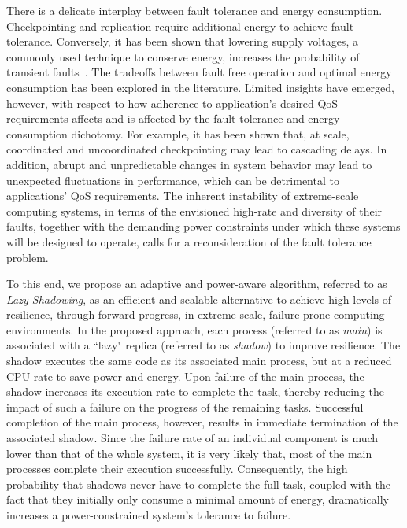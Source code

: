 There is a delicate interplay between fault tolerance and energy consumption. Checkpointing and replication require additional energy to achieve fault tolerance. Conversely, it has been shown that lowering supply voltages, a commonly used technique to conserve energy, increases the probability of transient faults~\cite{chandra2008defect}. The tradeoffs between fault free operation and optimal energy consumption has been explored in the literature. Limited insights have emerged, however, with respect to how adherence to application's desired QoS requirements affects and is affected by the fault tolerance and energy consumption dichotomy. For example, it has been shown that, at scale, coordinated and uncoordinated checkpointing may lead to cascading delays. %
In addition, abrupt and unpredictable changes in system behavior may lead to unexpected fluctuations in performance, which can be detrimental to applications' QoS requirements. The inherent instability of extreme-scale computing systems, in terms of the envisioned high-rate and diversity of their faults, together with the demanding power constraints under which these systems will be designed to operate, calls for a reconsideration of the fault tolerance problem.

To this end, we propose an adaptive and power-aware algorithm, referred to as \textit{Lazy
Shadowing}, as an efficient and scalable alternative to achieve high-levels of resilience, through
forward progress, in extreme-scale, failure-prone computing environments. In the proposed
approach, each process (referred to as \textit{main}) is associated with a ``lazy" replica (referred to as \textit{shadow}) to improve resilience. The shadow executes the same code as its
associated main process, but at a reduced CPU rate to save power and energy. %
Upon failure of the main process, the shadow increases its 
execution rate to complete the task, thereby reducing the impact of such a failure on the progress of
the remaining tasks. Successful completion of the main process, however, results in immediate
termination of the associated shadow. Since the failure rate of an individual component is much lower than that of 
the whole system, it is very likely that, most of the main processes complete their execution
successfully. %
Consequently, the high probability that shadows never have to complete the full task, coupled with the fact that 
they initially only consume a minimal amount of energy, 
dramatically increases a power-constrained system's tolerance to failure.


